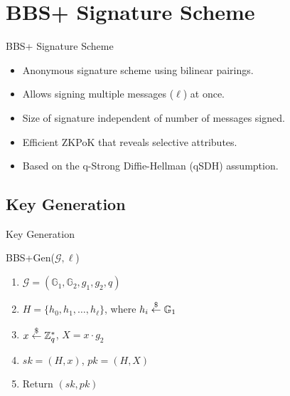 \documentclass[
	xcolor={svgnames},
	hyperref={pagebackref,bookmarks},
	aspectratio=43,
]{beamer}
\begin{document}

\section{BBS+ Signature Scheme}
\begin{frame}{BBS+ Signature Scheme}
	\begin{itemize}
		\item Anonymous signature scheme using bilinear pairings.
		\item Allows signing multiple messages ($\ell$) at once.
		\item Size of signature independent of number of messages signed.
		\item Efficient ZKPoK that reveals selective attributes.
		\item Based on the q-Strong Diffie-Hellman (qSDH) assumption.
	\end{itemize}
\end{frame}

\subsection{Key Generation}
\begin{frame}{Key Generation}
	\begin{block}{BBS+Gen($\mathcal{G}, \ell $)}
		\begin{enumerate}
			\item $\mathcal{G} = (\mathbb{G}_1, \mathbb{G}_2, g_1, g_2, q)$
			\item $H = \lbrace h_0, h_1, \ldots, h_{\ell} \rbrace$, where $h_i \stackrel{\$}{\leftarrow} \mathbb{G}_1$
			\item $x \stackrel{\$}{\leftarrow} \mathbb{Z}_q^*$, $X = x \cdot g_2$
			\item $sk = (H, x)$, $pk = (H, X)$
			\item Return $(sk, pk)$
		\end{enumerate}
	\end{block}
\end{frame}
\end{document}
